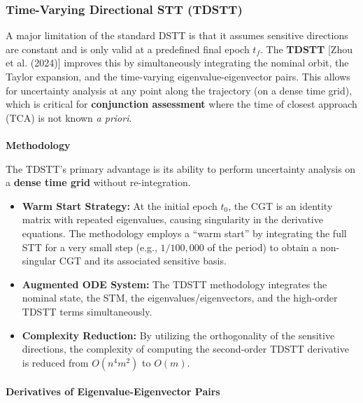 \documentclass[
  letterpaper,
  DIV=11,
  numbers=noendperiod,
  oneside]{scrartcl}
\makeatletter
\let\oldparagraph\paragraph
\renewcommand{\paragraph}{
    \@ifstar
      \xxxParagraphStar
      \xxxParagraphNoStar
  }
\newcommand{\xxxParagraphStar}[1]{\oldparagraph*{#1}\mbox{}}
\newcommand{\xxxParagraphNoStar}[1]{\oldparagraph{#1}\mbox{}}
\makeatother
\begin{document}
\subsubsection{Time-Varying Directional STT
(TDSTT)}\label{time-varying-directional-stt-tdstt}

A major limitation of the standard DSTT is that it assumes sensitive
directions are constant and is only valid at a predefined final epoch
\(t_f\). The \textbf{TDSTT} {[}Zhou et al. (2024){]} improves this by
simultaneously integrating the nominal orbit, the Taylor expansion, and
the time-varying eigenvalue-eigenvector pairs. This allows for
uncertainty analysis at any point along the trajectory (on a dense time
grid), which is critical for \textbf{conjunction assessment} where the
time of closest approach (TCA) is not known \emph{a priori}.

\paragraph{\texorpdfstring{\textbf{Methodology}}{Methodology}}\label{methodology}

The TDSTT's primary advantage is its ability to perform uncertainty
analysis on a \textbf{dense time grid} without re-integration.

\begin{itemize}
\item
  \textbf{Warm Start Strategy:} At the initial epoch \(t_0\), the CGT is
  an identity matrix with repeated eigenvalues, causing singularity in
  the derivative equations. The methodology employs a ``warm start'' by
  integrating the full STT for a very small step (e.g., \(1/100,000\) of
  the period) to obtain a non-singular CGT and its associated sensitive
  basis.
\item
  \textbf{Augmented ODE System:} The TDSTT methodology integrates the
  nominal state, the STM, the eigenvalues/eigenvectors, and the
  high-order TDSTT terms simultaneously.
\item
  \textbf{Complexity Reduction:} By utilizing the orthogonality of the
  sensitive directions, the complexity of computing the second-order
  TDSTT derivative is reduced from \(O(n^4m^2)\) to \(O(m)\).
\end{itemize}

\paragraph{\texorpdfstring{\textbf{Derivatives of Eigenvalue-Eigenvector
Pairs}}{Derivatives of Eigenvalue-Eigenvector Pairs}}\label{derivatives-of-eigenvalue-eigenvector-pairs}
\end{document}

